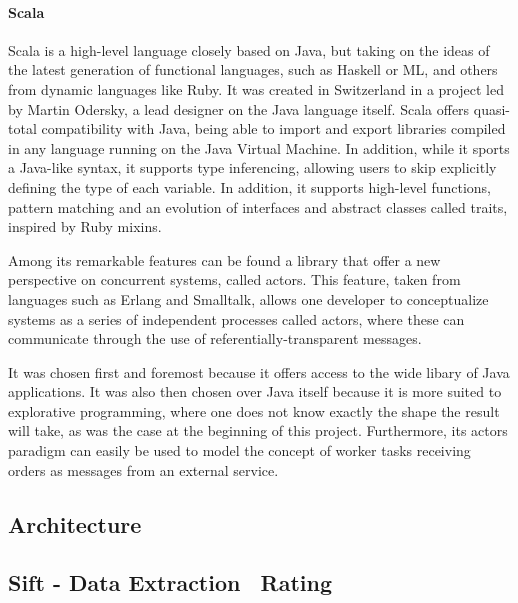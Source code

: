 
\paragraph{Scala} %
\label{par:scala}

Scala is a high-level language closely based on Java, but taking on the ideas of the latest generation of functional languages, such as Haskell or ML, and others from dynamic languages like Ruby. It was created in Switzerland in a project led by Martin Odersky, a lead designer on the Java language itself. Scala offers quasi-total compatibility with Java, being able to import and export libraries compiled in any language running on the Java Virtual Machine. In addition, while it sports a Java-like syntax, it supports type inferencing, allowing users to skip explicitly defining the type of each variable. In addition, it supports high-level functions, pattern matching and an evolution of interfaces and abstract classes called traits, inspired by Ruby mixins.

Among its remarkable features can be found a library that offer a new perspective on concurrent systems, called actors. This feature, taken from languages such as Erlang and Smalltalk, allows one developer to conceptualize systems as a series of independent processes called actors, where these can communicate through the use of referentially-transparent messages.

It was chosen first and foremost because it offers access to the wide libary of Java applications. It was also then chosen over Java itself because it is more suited to explorative programming, where one does not know exactly the shape the result will take, as was the case at the beginning of this project. Furthermore, its actors paradigm can easily be used to model the concept of worker tasks receiving orders as messages from an external service.



\subsection{Architecture} %
\label{sub:architecture}


\subsection{Sift - Data Extraction \amper\ Rating} %
\label{sub:sift_data_extraction_and_rating}

